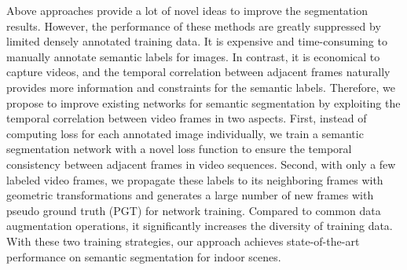 Above approaches provide a lot of novel ideas to improve the segmentation results. However, the performance of these methods are greatly suppressed by limited densely annotated training data.
%
It is expensive and time-consuming to manually annotate semantic labels for images. 
%
In contrast, it is economical to capture videos, and the temporal correlation between adjacent frames naturally provides more information and constraints for the semantic labels. 
%
Therefore, we propose to improve existing networks for semantic segmentation by exploiting the temporal correlation between video frames in two aspects.
%
First, instead of computing loss for each annotated image individually, we train a semantic segmentation network with a novel loss function to ensure the temporal consistency between adjacent frames in video sequences.
%
Second, with only a few labeled video frames, we propagate these labels to its neighboring frames with geometric transformations and generates a large number of new frames with pseudo ground truth (PGT) for network training. 
Compared to common data augmentation operations, it significantly increases the diversity of training data.
With these two training strategies, our approach achieves  state-of-the-art performance on semantic segmentation for indoor scenes. 
%
